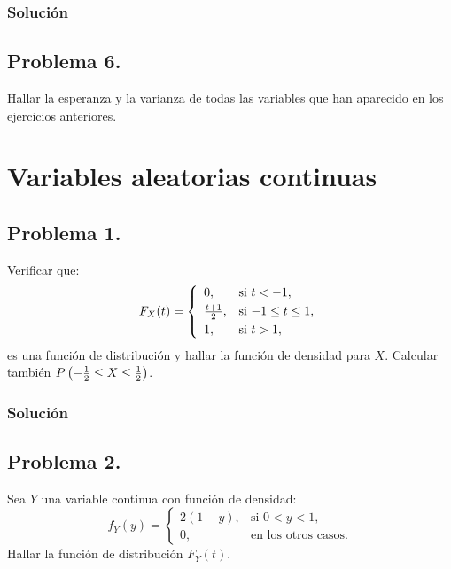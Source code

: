 \documentclass[
]{article}
\begin{document}
\hypertarget{soluciuxf3n-5}{%
\subsubsection{Solución}\label{soluciuxf3n-5}}

\hypertarget{problema-6.-1}{%
\subsection{Problema 6.}\label{problema-6.-1}}

Hallar la esperanza y la varianza de todas las variables que han
aparecido en los ejercicios anteriores.

\hypertarget{variables-aleatorias-continuas}{%
\section{Variables aleatorias
continuas}\label{variables-aleatorias-continuas}}

\hypertarget{problema-1.-1}{%
\subsection{Problema 1.}\label{problema-1.-1}}

Verificar que: \[
F_X (t)=
\left\{\begin{array}{ll}
0, & \mbox{si $t<-1$},
 \\[0.1cm]
{t+1\over 2}, & \mbox{si $-1\leq
t\leq 1$},
 \\[0.1cm]
1, & \mbox{si $t> 1$},
\end{array}\right.
\] es una función de distribución y hallar la función de densidad para
\(X\). Calcular también
\(P\left(-{1\over 2}\leq X\leq {1\over 2}\right)\).

\hypertarget{soluciuxf3n-6}{%
\subsubsection{Solución}\label{soluciuxf3n-6}}

\hypertarget{problema-2.-1}{%
\subsection{Problema 2.}\label{problema-2.-1}}

Sea \(Y\) una variable continua con función de densidad: \[
f_Y(y)=
\left\{\begin{array}{ll}
2(1-y), & \mbox{si $0<y<1$},\\ 0, & \mbox{en los otros casos}.
\end{array}\right.
\] Hallar la función de distribución \(F_Y(t)\).
\end{document}

